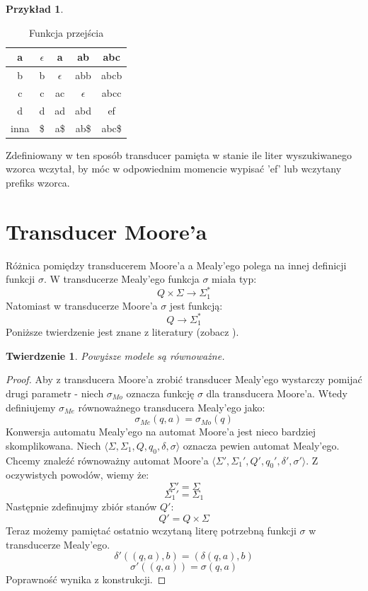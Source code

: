\documentclass[declaration,shortabstract]{iithesis}
\theoremstyle{definition}
\newtheorem{exmp}{Przykład}[section]
\theoremstyle{plain}
\newtheorem{theorem}{Twierdzenie}
\begin{document}
\begin{exmp}
\begin{table}[h]
\begin{tabular}{|c||c | c | c| c|}
        a & \(\epsilon\) & a & ab  & abc \\ \hline
        b & b & \(\epsilon\) & abb & abcb \\ \hline
        c & c & ac & \(\epsilon\) & abcc \\ \hline
        d & d & ad & abd & ef \\ \hline 
        inna & \$ & a\$ & ab\$ & abc\$\\  \hline
    \end{tabular} 
    \caption{Funkcja przejścia}
    \label{tab:my_label}
\end{table}
Zdefiniowany w ten sposób transducer pamięta w stanie ile liter wyszukiwanego wzorca wczytał, by móc w odpowiednim momencie wypisać 'ef' lub wczytany prefiks wzorca.
\end{exmp}
\section{Transducer Moore'a}
Różnica pomiędzy transducerem Moore'a a Mealy'ego polega na innej definicji funkcji \(\sigma\)\cite{Moore book}. W transducerze Mealy'ego funkcja \(\sigma\) miała typ:
$$ Q \times \Sigma \rightarrow \Sigma_1^{*} $$
Natomiast w transducerze Moore'a \(\sigma\) jest funkcją:
$$ Q \rightarrow \Sigma_1^{*} $$
Poniższe twierdzenie jest znane z literatury (zobacz \cite{linz2011introduction}).
\begin{theorem}
\label{rownowaznosc transducerow}
Powyższe modele są równoważne. 
\end{theorem}
\begin{proof} 
Aby z transducera Moore'a zrobić transducer Mealy'ego wystarczy pomijać drugi parametr - niech \(\sigma_{Mo} \) oznacza funkcję \(\sigma\)  dla transducera Moore'a. Wtedy definiujemy \(\sigma_{Me}\) równoważnego transducera Mealy'ego jako:
$$ \sigma_{Me}(q, a) = \sigma_{Mo}(q) $$
Konwersja automatu Mealy'ego na automat Moore'a jest nieco bardziej skomplikowana. Niech \( \langle \Sigma, \Sigma_1, Q, q_0, \delta, \sigma \rangle \) oznacza pewien automat Mealy'ego. Chcemy znaleźć równoważny automat Moore'a \(\langle\Sigma', \Sigma_1', Q', q_0', \delta', \sigma'\rangle\). Z oczywistych powodów, wiemy że:
$$ \Sigma' = \Sigma $$
$$ \Sigma_1' = \Sigma_1 $$
Następnie zdefinujmy zbiór stanów \(Q'\):
$$ Q' = Q \times \Sigma $$
Teraz możemy pamiętać ostatnio wczytaną literę potrzebną funkcji \(\sigma\) w transducerze Mealy'ego.
$$ \delta'( (q,a), b) = (\delta(q,a), b) $$
$$ \sigma'( (q,a) ) = \sigma(q,a) $$
Poprawność wynika z konstrukcji.
\end{proof}
\end{document}
